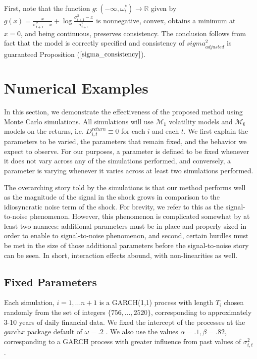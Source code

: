 \documentclass[11pt,3p,review,authoryear]{elsarticle}
\def\mc#1{\mathcal{#1}} %
\def\mc#1{\mathcal{#1}}
\theoremstyle{definition}
\newenvironment{proof-of-proposition}[1][{}]{\noindent{\bf
    Proof of Proposition {#1}}
  \hspace*{.5em}}{\qed\bigskip\\}
\begin{document}
\begin{proof-of-proposition}
  First, note that the function $g:(-\infty,\omega_{i}^{*})\rightarrow \mathbb{R}$ given by $g(x) = \frac{x}{\sigma^{2}_{t+1}-x} + \log{\frac{\sigma_{t+1}^{2}-x}{\sigma_{t+1}^{2}} }$ is nonnegative, convex, obtains a minimum at $x = 0$, and being continuous, preserves consistency. The conclusion follows from fact that the model is correctly specified and consistency of $sigma^{2}_{adjusted}$ is guaranteed Proposition ($\ref{sigma_consistency}$). 
  
\end{proof-of-proposition}

\section{Numerical Examples}

In this section, we demonstrate the effectiveness of the proposed method using Monte Carlo simulations.  All simulations will use $\mc{M}_1$ volatility models and $\mc{M}_0$ models on the returns, i.e. $  D^{return}_{i,t} \equiv 0$ for each $i$ and each $t$.  We first explain the parameters to be varied, the parameters that remain fixed, and the behavior we expect to observe.  For our purposes, a parameter is defined to be fixed whenever it does not vary across any of the simulations performed, and conversely, a parameter is varying whenever it varies across at least two simulations performed.

The overarching story told by the simulations is that our method performs well as the magnitude of the signal in the shock grows in comparison to the idiosyncratic noise term of the shock.  For brevity, we refer to this as the signal-to-noise phenomenon.  However, this phenomenon is complicated somewhat by at least two nuances: additional parameters must be in place and properly sized in order to enable to signal-to-noise phenomenon, and second, certain hurdles must be met in the size of those additional parameters before the signal-to-noise story can be seen.  In short, interaction effects abound, with non-linearities as well.

  \subsection{Fixed Parameters}
Each simulation, $i=1,...n+1$ is a GARCH(1,1) process with length $T_{i}$ chosen randomly from the set of integers $\{756,...,2520\}$, corresponding to approximately 3-10 years of daily financial data.  We fixed the intercept of the processes at the $\textit{garchx}$ package default of $\omega = .2$ \citep{RePEc:pra:mprapa:100301}.  We also use the values $\alpha=.1, \beta = .82$, corresponding to a GARCH process with greater influence from past values of $\sigma^{2}_{i,t}$.
\end{document}
